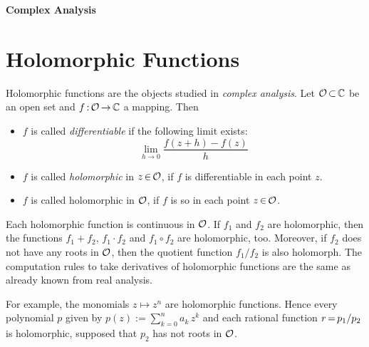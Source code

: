 \documentclass[11pt,twoside]{article}
\begin{document}
\thispagestyle{empty}

\def\Title{Complex Analysis}

\centerline{\large{\textbf{\Title}}}
\vspace{4pt}
\centerline{\small{{\textsc{\Author}}}}
\vspace{10pt}



\fancyhead[C] {\small{\textsc{\Title}}}
\fancyhead[OL]{\small{\thepage}}
\fancyhead[ER]{\small{\thepage}}


\part{Holomorphic Functions}
Holomorphic functions are the objects studied in \textit{complex analysis}.
Let $\mathcal{O} {\,\subset\,} {\mathbb{C}}$ be an open set and $f {\,:\,} \mathcal{O} {\,\to\,} {\mathbb{C}}$ a mapping.
Then

\begin{itemize}
\item[1.]
$f$ is called \textit{differentiable} if the following limit exists:
\[
\lim_{h \to 0} \frac{f(z+h) - f(z)}{h}
\]
\item[2.]
$f$ is called \textit{holomorphic} in $z {\,\in\,} \mathcal{O}$,
if $f$ is differentiable in each point $z$.
\item[3.]
$f$ is called holomorphic in $\mathcal{O}$,
if $f$ is so in each point $z {\,\in\,} \mathcal{O}$.
\end{itemize}

\subparagraph{}
Each holomorphic function is continuous in $\mathcal{O}$.
If $f_1$ and $f_2$ are holomorphic,
then the functions $f_1{+}f_2$, $f_1 {\cdot} f_2$ and $f_1 {\circ} f_2$
are holomorphic,
too.
Moreover,
if $f_2$ does not have any roots in $\mathcal{O}$,
then the quotient function $f_1/f_2$ is also holomorph.
The computation rules to take derivatives of holomorphic functions are the same
as already known from real analysis.

\subparagraph{}
For example,
the monomials $z \mapsto z^n$ are holomorphic functions.
Hence every polynomial $p$ given by $p(z) := \sum_{k=0}^n a_k\,z^k$
and each rational function $r {\,=\,} p_1 / p_2$ is holomorphic,
supposed that $p_2$ has not roots in $\mathcal{O}$.
\end{document}
